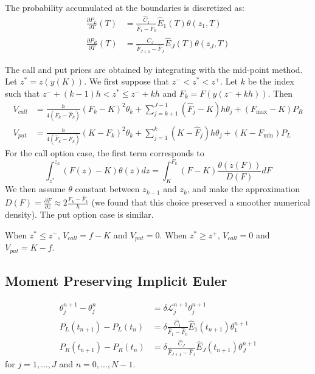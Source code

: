 \documentclass[]{rAMF2e}
\begin{document}
The probability accumulated at the boundaries is discretized as:
\begin{align}
\frac{\partial P_L}{\partial T} (T) &= \frac{\hat{C}_1}{\hat{F}_1-\hat{F}_0}\hat{E}_1(T)\theta(z_1, T) \\
\frac{\partial P_R}{\partial T} (T) &= \frac{\hat{C}_J}{\hat{F}_{J+1}-\hat{F}_J}\hat{E}_J(T)\theta(z_J, T) 
\end{align}

The call and put prices are obtained by integrating with the mid-point method. Let $z^* = z(y(K))$. We first suppose that $z^{-} < z^* < z^{+}$. Let $k$ be the index such that $z^{-}+(k-1)h < z^* \leq z^{-}+k h$ and $F_k = F(y(z^{-}+kh))$. Then
\begin{align*}
V_{call} &= \frac{h}{4(F_k-\hat{F}_k)}(F_k - K)^2 \theta_k 
+ \sum_{j=k+1}^{J-1} (\hat{F}_j - K) h \theta_j 
+ (F_{\max}-K) P_R\\
V_{put} &= \frac{h}{4(\hat{F}_k-F_k)}(K-F_k)^2 \theta_k 
+ \sum_{j=1}^{k} (K-\hat{F}_j) h \theta_j 
+ (K-F_{\min}) P_L
\end{align*}
For the call option case, the first term corresponds to 
\begin{equation}
\int_{z^*}^{z_k}(F(z)-K)\theta(z)dz = \int_{K}^{F_k}(F-K)\frac{\theta(z(F))}{D(F)}dF
\end{equation}
 We then assume $\theta$ constant between $z_{k-1}$ and $z_{k}$, and make the approximation $D(F)=\frac{\partial F}{\partial z} \approx 2\frac{F_k-\hat{F}_k}{h}$ (we found that this choice preserved a smoother numerical density). The put option case is similar.


When $z^* \leq z^{-}$, $V_{call} = f-K$ and $V_{put} = 0$. When $z^* \geq z^{+}$, $V_{call} = 0$ and $V_{put} = K-f$.

\subsection{Moment Preserving Implicit Euler}
\begin{subequations}
\begin{align}
\theta_j^{n+1}-\theta_j^n &= \delta \mathcal{L}_{j}^{n+1} \theta_j^{n+1} \\
P_L (t_{n+1}) - P_L (t_{n}) &= \delta \frac{\hat{C}_1}{\hat{F}_1-\hat{F}_0}\hat{E}_1(t_{n+1})\theta_1^{n+1} \\
P_R (t_{n+1}) -  P_R (t_{n}) &= \delta \frac{\hat{C}_J}{\hat{F}_{J+1}-\hat{F}_J}\hat{E}_J(t_{n+1})\theta_J^{n+1}
\end{align}
\end{subequations}
for $j=1,...,J$ and $n=0,...,N-1$.
\end{document}
